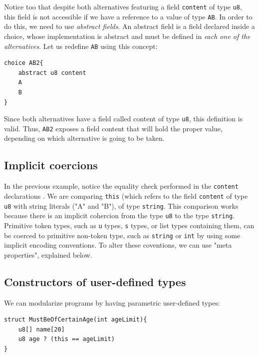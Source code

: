 \documentclass[10pt,oneside]{article}
\begin{document}
Notice too that despite both alternatives featuring a field
\texttt{content} of type \texttt{u8}, this field is not accessible if we
have a reference to a value of type \texttt{AB}. In order to do this, we
need to use \emph{abstract fields}. An abstract field is a field
declared inside a choice, whose implementation is abstract and must be
defined in \emph{each one of the alternatives}. Let us redefine
\texttt{AB} using this concept:

\begin{verbatim}
choice AB2{
    abstract u8 content
    A
    B
}
\end{verbatim}

Since both alternatives have a field called content of type \texttt{u8},
this definition is valid. Thus, \texttt{AB2} exposes a field content
that will hold the proper value, depending on which alternative is going
to be taken.

\hypertarget{implicit-coercions}{%
\subsection{Implicit coercions}\label{implicit-coercions}}

In the previous example, notice the equality check performed in the
\texttt{content} declarations . We are comparing \texttt{this} (which
refers to the field \texttt{content} of type \texttt{u8} with string
literals ("A" and "B"), of type \texttt{string}. This comparison works
because there is an implicit cohercion from the type \texttt{u8} to the
type \texttt{string}. Primitive token types, such as \texttt{u} types,
\texttt{s} types, or list types containing them, can be coerced to
primitive non-token type, such as \texttt{string} or \texttt{int} by
using some implicit encoding conventions. To alter these coventions, we
can use "meta properties", explained below.

\hypertarget{constructors-of-user-defined-types}{%
\subsection{Constructors of user-defined
types}\label{constructors-of-user-defined-types}}

We can modularize programs by having parametric user-defined types:

\begin{verbatim}
struct MustBeOfCertainAge(int ageLimit){
    u8[] name[20]
    u8 age ? (this == ageLimit)
}
\end{verbatim}
\end{document}

